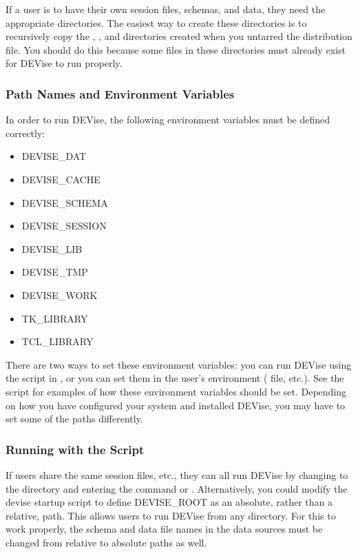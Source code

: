 If a user is to have their own session files, schemas, and data, they need
the appropriate directories.  The easiest way to create these directories
is to recursively copy the , , and
 directories created when you untarred the distribution
file.  You should do this because some files in these directories must
already exist for DEVise to run properly.

\subsubsection{Path Names and Environment Variables}

In order to run DEVise, the following environment variables must be defined correctly:

\begin{itemize}
	\item DEVISE\_DAT
	\item DEVISE\_CACHE
	\item DEVISE\_SCHEMA
	\item DEVISE\_SESSION
	\item DEVISE\_LIB
	\item DEVISE\_TMP
	\item DEVISE\_WORK
	\item TK\_LIBRARY
	\item TCL\_LIBRARY
\end{itemize}

There are two ways to set these environment variables: you can run DEVise using the
 script in , or you can set them in the user's
environment ( file, etc.).  See the  script for
examples of how these environment variables should be set.  Depending on how you
have configured your system and installed DEVise, you may have to set some of the
paths differently.

\subsubsection{Running with the  Script}

If users share the same session files, etc., they can all run DEVise by changing to the
directory  and entering the command  or .
Alternatively, you could modify the devise startup script to define DEVISE\_ROOT as an
absolute, rather than a relative, path.  This allows users to run DEVise from any directory.
For this to work properly, the schema and data file names in the data sources must be
changed from relative to absolute paths as well.

